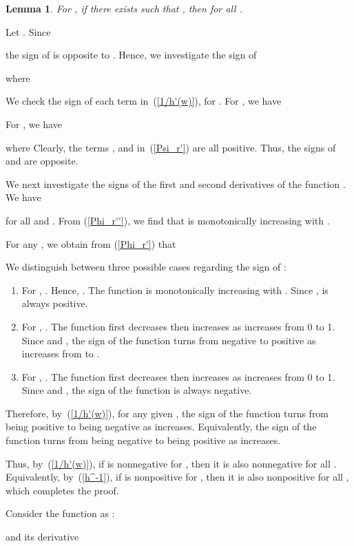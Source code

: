 \documentclass{IEEEtran}
\newtheorem{lemma}{Lemma}
\begin{document}
\begin{lemma} \label{unstable then unstable}
For , if there exists  such that , then  for all .
\end{lemma}
\begin{IEEEproof}
Let .
Since

the sign of  is opposite to . Hence, we investigate the sign of

where


We check the sign of each term  in~(\ref{1/h'(w)}), for .
For , we have


For , we have

where  Clearly, the terms ,  and  in~(\ref{Psi_r'}) are all positive. Thus, the signs of  and
 are opposite.

We next investigate the signs of the first and second derivatives of the function . We have

for all  and .
From (\ref{Phi_r''}), we find that  is monotonically increasing with .

For any , we obtain from (\ref{Phi_r'}) that


We distinguish between three possible cases regarding the sign of :
\begin{enumerate}
	\item For , . Hence, . The function  is monotonically increasing with . Since
,  is always positive.
	\item For , . The function  first decreases then increases as  increases from 0 to 1. Since
 and , the sign of the function  turns from negative to positive as  increases from  to .
	\item For , . The function  first decreases then increases as  increases from 0 to 1. Since
 and , the sign of the function  is always negative.
\end{enumerate}

Therefore, by~(\ref{1/h'(w)}), for any given , the sign of the function  turns from being positive to being
negative as  increases. Equivalently, the sign of the function  turns from being negative to being positive as  increases.

Thus, by~(\ref{1/h'(w)}), if  is nonnegative for , then it is also nonnegative for all .
Equivalently, by~(\ref{h^-1}), if  is nonpositive for , then it is also nonpositive for all ,
which completes the proof.
\end{IEEEproof}

Consider the function  as :

and its derivative
\end{document}
